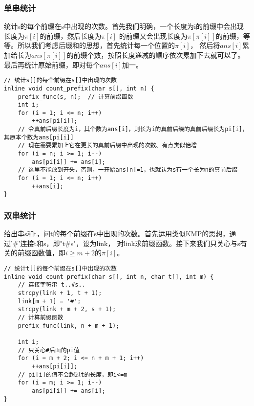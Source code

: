         \subsubsection{单串统计}
            统计s的每个前缀在s中出现的次数。首先我们明确，一个长度为i的前缀中会出现长度为$\pi[i]$的前缀，然后长度为$\pi[i]$
            的前缀又会出现长度为$\pi[\pi[i]]$的前缀，等等。所以我们考虑后缀和的思想，首先统计每一个位置的$\pi[i]$，
            然后将$ans[i]$累加给长为$ans[\pi[i]]$的前缀个数，按照长度递减的顺序依次累加下去就可以了。
            最后再统计原始前缀，即对每个$ans[i]$加一。
            \begin{lstlisting}
// 统计s[]的每个前缀在s[]中出现的次数
inline void count_prefix(char s[], int n) {
    prefix_func(s, n);  // 计算前缀函数
    int i;
    for (i = 1; i <= n; i++)
        ++ans[pi[i]];
    // 令真前后缀长度为i，其个数为ans[i]，则长为i的真前后缀的真前后缀长为pi[i]，其原本个数为ans[pi[i]]
    // 现在需要累加上它在更长的真前后缀中出现的次数。有点类似倍增
    for (i = n; i >= 1; i--)
        ans[pi[i]] += ans[i];
    // 这里不能放到开头，否则，一开始ans[n]=1，也就认为s有一个长为n的真前后缀
    for (i = 1; i <= n; i++)
        ++ans[i];
}
            \end{lstlisting}
        \subsubsection{双串统计}
            给出串s和t，问t的每个前缀在s中出现的次数。首先运用类似KMP的思想，通过'\#'连接t和s，即"t\#s"，设为link，
            对link求前缀函数。接下来我们只关心与s有关的前缀函数值，即$i \ge m+2$的$\pi[i]$。
            \begin{lstlisting}
// 统计t[]的每个前缀在s[]中出现的次数
inline void count_prefix(char s[], int n, char t[], int m) {
    // 连接字符串 t..#s..
    strcpy(link + 1, t + 1);
    link[m + 1] = '#';
    strcpy(link + m + 2, s + 1);
    // 计算前缀函数
    prefix_func(link, n + m + 1);

    int i;
    // 只关心#后面的pi值
    for (i = m + 2; i <= n + m + 1; i++)
        ++ans[pi[i]];
    // pi[i]的值不会超过t的长度，即i<=m
    for (i = m; i >= 1; i--)
        ans[pi[i]] += ans[i];
}
            \end{lstlisting}

